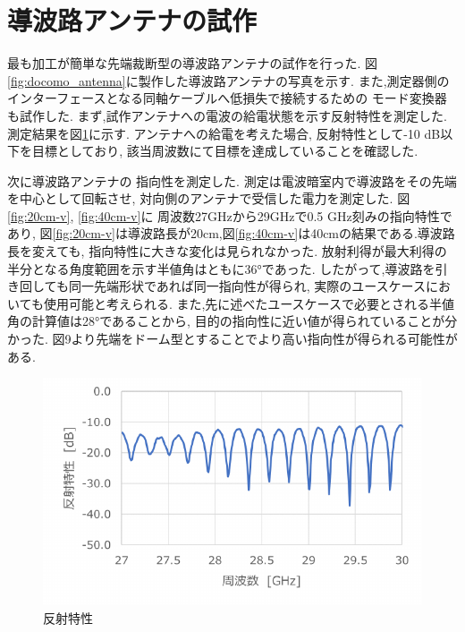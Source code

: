 \documentclass[technicalreport]{ieicej}
\begin{document}
\section{導波路アンテナの試作}

最も加工が簡単な先端裁断型の導波路アンテナの試作を行った.
図\ref{fig:docomo_antenna}に製作した導波路アンテナの写真を示す.
また,測定器側のインターフェースとなる同軸ケーブルへ低損失で接続するための
モード変換器も試作した.
まず,試作アンテナへの電波の給電状態を示す反射特性を測定した.
測定結果を図\ref{fig:reflection_params}に示す.
アンテナへの給電を考えた場合,
反射特性として-10 dB以下を目標としており,
該当周波数にて目標を達成していることを確認した.

次に導波路アンテナの
指向性を測定した.
測定は電波暗室内で導波路をその先端を中心として回転させ,
対向側のアンテナで受信した電力を測定した.
図\ref{fig:20cm-v}, \ref{fig:40cm-v}に
周波数27GHzから29GHzで0.5 GHz刻みの指向特性であり,
図\ref{fig:20cm-v}は導波路長が20cm,図\ref{fig:40cm-v}は40cmの結果である.導波路長を変えても,
指向特性に大きな変化は見られなかった.
放射利得が最大利得の半分となる角度範囲を示す半値角はともに36°であった.
したがって,導波路を引き回しても同一先端形状であれば同一指向性が得られ,
実際のユースケースにおいても使用可能と考えられる.
また,先に述べたユースケースで必要とされる半値角の計算値は28°であることから,
目的の指向性に近い値が得られていることが分かった.
図9より先端をドーム型とすることでより高い指向性が得られる可能性がある.

\begin{figure}[tb]
  \begin{center}
    \includegraphics[bb=0.000000 0.000000 312.875761 187.419999, width=1.0\linewidth]{img/reflection_params.pdf}
    \caption{反射特性}
    \label{fig:reflection_params}
  \end{center}
\end{figure}
\end{document}

